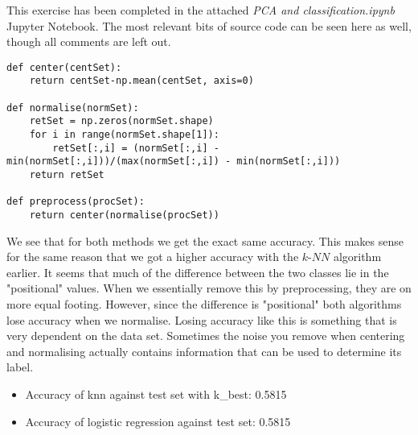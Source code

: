 This exercise has been completed in the attached \textit{PCA and classification.ipynb} Jupyter Notebook. The most relevant bits of source code can be seen here as well, though all comments are left out.
\begin{verbatim}
def center(centSet):
    return centSet-np.mean(centSet, axis=0)

def normalise(normSet):
    retSet = np.zeros(normSet.shape)
    for i in range(normSet.shape[1]):
        retSet[:,i] = (normSet[:,i] - min(normSet[:,i]))/(max(normSet[:,i]) - min(normSet[:,i]))
    return retSet

def preprocess(procSet):
    return center(normalise(procSet))
\end{verbatim}
We see that for both methods we get the exact same accuracy. This makes sense for the same reason that we got a higher accuracy with the $k$-$NN$ algorithm earlier. It seems that much of the difference between the two classes lie in the "positional" values. When we essentially remove this by preprocessing, they are on more equal footing. However, since the difference is "positional" both algorithms lose accuracy when we normalise. Losing accuracy like this is something that is very dependent on the data set. Sometimes the noise you remove when centering and normalising actually contains information that can be used to determine its label.
\begin{itemize}
\item Accuracy of knn against test set with k\_best: 0.5815
\item Accuracy of logistic regression against test set: 0.5815
\end{itemize}